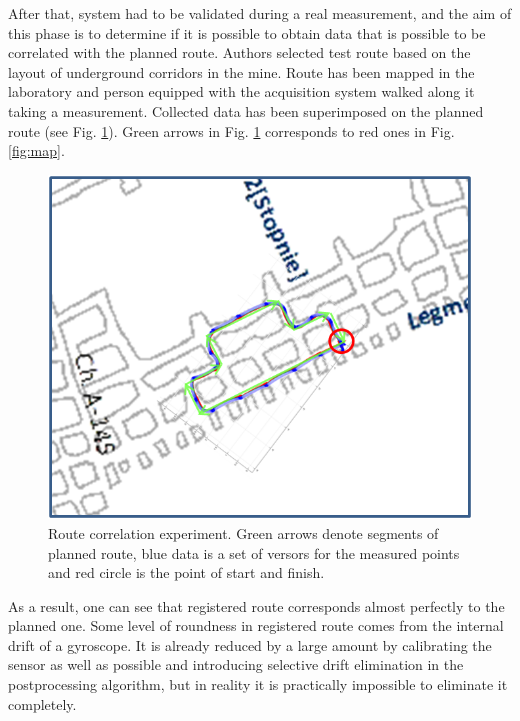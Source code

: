 \documentclass[10pt, a4paper]{article}
\begin{document}
After that, system had to be validated during a real measurement, and the aim of this phase is to determine if it is possible to obtain data that is possible to be correlated with the planned route. Authors selected test route based on the layout of underground corridors in the mine. Route has been mapped in the laboratory and person equipped with the acquisition system walked along it taking a measurement. Collected data has been superimposed on the planned route (see Fig. \ref{fig:map3}). Green arrows in Fig. \ref{fig:map3} corresponds to red ones in Fig. \ref{fig:map}. 

\begin{figure}[ht!]
    \centering
    \includegraphics[width=.7\textwidth]{fig/map3.png}
    \caption{Route correlation experiment. Green arrows denote segments of planned route, blue data is a set of versors for the measured points and red circle is the point of start and finish.}
    \label{fig:map3}
\end{figure}

As a result, one can see that registered route corresponds almost perfectly to the planned one. Some level of roundness in registered route comes from the internal drift of a gyroscope. It is already reduced by a large amount by calibrating the sensor as well as possible and introducing selective drift elimination in the postprocessing algorithm, but in reality it is practically impossible to eliminate it completely.
\end{document}
